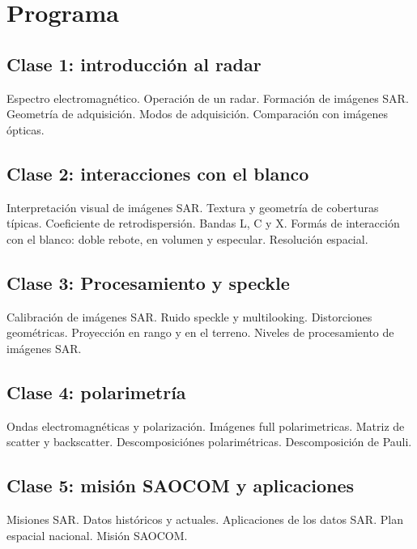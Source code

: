 \section*{Programa}

\subsection*{Clase 1: introducción al radar}
Espectro electromagnético. Operación de un radar. Formación de imágenes SAR. Geometría de adquisición. Modos de adquisición. Comparación con imágenes ópticas.

\subsection*{Clase 2: interacciones con el blanco}
Interpretación visual de imágenes SAR. Textura y geometría de coberturas típicas. Coeficiente de retrodispersión. Bandas L, C y X. Formás de interacción con el blanco: doble rebote, en volumen y especular. Resolución espacial.

\subsection*{Clase 3: Procesamiento y speckle}
Calibración de imágenes SAR. Ruido speckle y multilooking. Distorciones geométricas. Proyección en rango y en el terreno. Niveles de procesamiento de imágenes SAR.

\subsection*{Clase 4: polarimetría}
Ondas electromagnéticas y polarización. Imágenes full polarimetricas. Matriz de scatter y backscatter. Descomposiciónes polarimétricas. Descomposición de Pauli.

\subsection*{Clase 5: misión SAOCOM y aplicaciones}
Misiones SAR. Datos históricos y actuales. Aplicaciones de los datos SAR. Plan espacial nacional. Misión SAOCOM.

